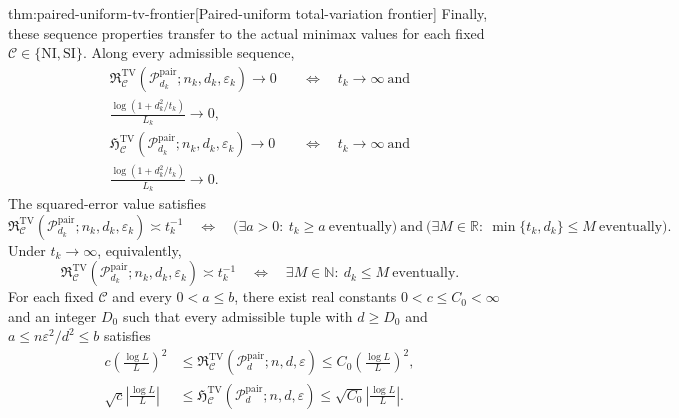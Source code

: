 \begin{theoremv}{thm:paired-uniform-tv-frontier}[Paired-uniform total-variation frontier]
Finally, these sequence properties transfer to the actual minimax values for each fixed \(\mathcal C\in\{\mathrm{NI},\mathrm{SI}\}\). Along every admissible sequence,
\[
\begin{aligned}
 \mathfrak R^{\mathrm{TV}}_{\mathcal C}
   (\mathcal P_{d_k}^{\mathrm{pair}};n_k,d_k,\varepsilon_k)
   \longrightarrow0
 &\quad\Longleftrightarrow\quad
 t_k\longrightarrow\infty
 \ \text{and}\\
 \frac{\log(1+d_k^2/t_k)}{L_k}\longrightarrow0,\\
 \mathfrak H^{\mathrm{TV}}_{\mathcal C}
   (\mathcal P_{d_k}^{\mathrm{pair}};n_k,d_k,\varepsilon_k)
   \longrightarrow0
 &\quad\Longleftrightarrow\quad
 t_k\longrightarrow\infty
 \ \text{and}\\
 \frac{\log(1+d_k^2/t_k)}{L_k}\longrightarrow0.
\end{aligned}
\]
The squared-error value satisfies
\[
 \mathfrak R^{\mathrm{TV}}_{\mathcal C}
   (\mathcal P_{d_k}^{\mathrm{pair}};n_k,d_k,\varepsilon_k)
   \asymp t_k^{-1}
 \quad\Longleftrightarrow\quad
 \bigl(\exists a>0:\ t_k\ge a\ \text{eventually}\bigr)
 \ \text{and}\
 \bigl(\exists M\in\mathbb R:\ \min\{t_k,d_k\}\le M\
       \text{eventually}\bigr).
\]
Under \(t_k\to\infty\), equivalently,
\[
 \mathfrak R^{\mathrm{TV}}_{\mathcal C}
   (\mathcal P_{d_k}^{\mathrm{pair}};n_k,d_k,\varepsilon_k)
   \asymp t_k^{-1}
 \quad\Longleftrightarrow\quad
 \exists M\in\mathbb N:\ d_k\le M\ \text{eventually}.
\]
For each fixed \(\mathcal C\) and every \(0<a\le b\), there exist real constants \(0<c\le C_0<\infty\) and an integer \(D_0\) such that every admissible tuple with \(d\ge D_0\) and \(a\le n\varepsilon^2/d^2\le b\) satisfies
\[
\begin{aligned}
 c\left(\frac{\log L}{L}\right)^2
 &\le
 \mathfrak R^{\mathrm{TV}}_{\mathcal C}
   (\mathcal P_d^{\mathrm{pair}};n,d,\varepsilon)
 \le C_0\left(\frac{\log L}{L}\right)^2,\\
 \sqrt c\left|\frac{\log L}{L}\right|
 &\le
 \mathfrak H^{\mathrm{TV}}_{\mathcal C}
   (\mathcal P_d^{\mathrm{pair}};n,d,\varepsilon)
 \le \sqrt{C_0}\left|\frac{\log L}{L}\right|.
\end{aligned}
\]
\end{theoremv}

